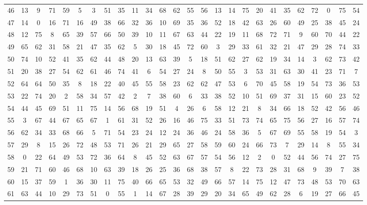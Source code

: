 \begin{table}
\begin{tabular}{c c c c c c c c c c c c c c c c c c c c c c c c c c }
46 & 13 & 9 & 71 & 59 & 5 & 3 & 51 & 35 & 11 & 34 & 68 & 62 & 55 & 56 & 13 & 14 & 75 & 20 & 41 & 35 & 62 & 72 & 0 & 75 & 54 \\
47 & 14 & 0 & 16 & 71 & 16 & 49 & 38 & 66 & 32 & 36 & 10 & 69 & 35 & 36 & 52 & 18 & 42 & 63 & 26 & 60 & 49 & 25 & 38 & 45 & 24 \\
48 & 12 & 75 & 8 & 65 & 39 & 57 & 66 & 50 & 39 & 10 & 11 & 67 & 63 & 44 & 22 & 19 & 11 & 68 & 72 & 71 & 9 & 60 & 70 & 44 & 22 \\
49 & 65 & 62 & 31 & 58 & 21 & 47 & 35 & 62 & 5 & 30 & 18 & 45 & 72 & 60 & 3 & 29 & 33 & 61 & 32 & 21 & 47 & 29 & 28 & 74 & 33 \\
50 & 74 & 10 & 52 & 41 & 35 & 62 & 44 & 48 & 20 & 13 & 63 & 39 & 5 & 18 & 51 & 62 & 27 & 62 & 19 & 34 & 14 & 3 & 62 & 73 & 42 \\
51 & 20 & 38 & 27 & 54 & 62 & 61 & 46 & 74 & 41 & 6 & 54 & 27 & 24 & 8 & 50 & 55 & 3 & 53 & 31 & 63 & 30 & 41 & 23 & 71 & 7 \\
52 & 64 & 64 & 50 & 35 & 8 & 18 & 22 & 40 & 45 & 55 & 58 & 23 & 62 & 62 & 47 & 53 & 6 & 70 & 45 & 58 & 19 & 54 & 73 & 36 & 53 \\
53 & 22 & 74 & 20 & 2 & 58 & 34 & 57 & 42 & 2 & 7 & 38 & 60 & 6 & 33 & 38 & 52 & 10 & 51 & 69 & 37 & 31 & 15 & 60 & 23 & 52 \\
54 & 44 & 45 & 69 & 51 & 11 & 75 & 14 & 56 & 68 & 19 & 51 & 4 & 26 & 6 & 58 & 12 & 21 & 8 & 34 & 66 & 18 & 52 & 42 & 56 & 46 \\
55 & 3 & 67 & 44 & 67 & 65 & 67 & 1 & 61 & 31 & 52 & 26 & 16 & 46 & 75 & 33 & 51 & 73 & 74 & 65 & 75 & 56 & 27 & 16 & 57 & 74 \\
56 & 62 & 34 & 33 & 68 & 66 & 5 & 71 & 54 & 23 & 24 & 12 & 24 & 36 & 46 & 24 & 58 & 36 & 5 & 67 & 69 & 55 & 58 & 19 & 54 & 3 \\
57 & 29 & 8 & 15 & 26 & 72 & 48 & 53 & 71 & 26 & 21 & 29 & 65 & 27 & 58 & 59 & 60 & 24 & 66 & 73 & 7 & 29 & 14 & 8 & 55 & 34 \\
58 & 0 & 22 & 64 & 49 & 53 & 72 & 36 & 64 & 8 & 45 & 52 & 63 & 67 & 57 & 54 & 56 & 12 & 2 & 0 & 52 & 44 & 56 & 74 & 27 & 75 \\
59 & 21 & 71 & 60 & 46 & 68 & 10 & 63 & 39 & 18 & 26 & 25 & 36 & 68 & 38 & 57 & 8 & 22 & 73 & 28 & 31 & 68 & 9 & 39 & 7 & 38 \\
60 & 15 & 37 & 59 & 1 & 36 & 30 & 11 & 75 & 40 & 66 & 65 & 53 & 32 & 49 & 66 & 57 & 14 & 75 & 12 & 47 & 73 & 48 & 53 & 70 & 63 \\
61 & 63 & 44 & 10 & 29 & 73 & 51 & 0 & 55 & 1 & 14 & 67 & 28 & 39 & 29 & 20 & 34 & 65 & 49 & 62 & 28 & 6 & 19 & 27 & 66 & 45 \\

\end{tabular}
\end{table}
